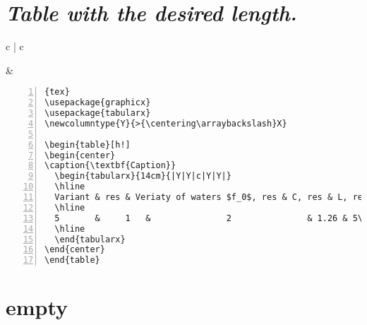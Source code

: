 \section{\textit{Table with the desired length. }}
\begin{table}[h!]
\begin{tabular}{c | c}
\begin{minipage}[m]{0.4\textwidth}
\end{minipage}
&
\begin{minipage}[m]{0.55\textwidth}
\renewcommand\textminus{\mbox{-}}%
\begin{lstlisting}[numberstyle=\zebra{green!15}{yellow!15},numbers=left,basicstyle=\scriptsize]{tex}
\usepackage{graphicx}
\usepackage{tabularx}
\newcolumntype{Y}{>{\centering\arraybackslash}X}

\begin{table}[h!]
\begin{center}
\caption{\textbf{Caption}}
  \begin{tabularx}{14cm}{|Y|Y|c|Y|Y|}
  \hline
  Variant & res & Veriaty of waters $f_0$, res & C, res & L, res\\
  \hline
  5       &     1   &               2               & 1.26 & 5\\
  \hline
  \end{tabularx}
\end{center}
\end{table}
\end{lstlisting}
\end{minipage}
\end{tabular}
\end{table}

 \section{empty}

\vspace{0.2cm}  
\clearpage
